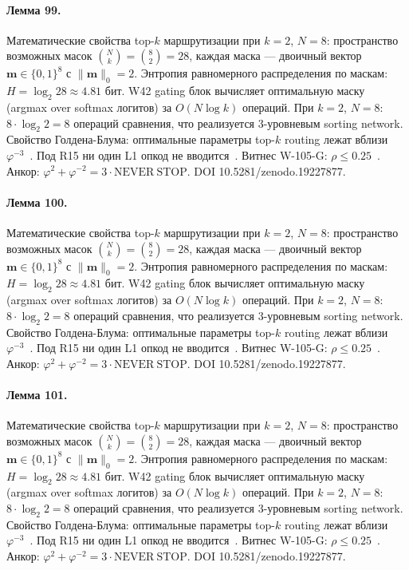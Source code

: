 \paragraph{Лемма 99.} Математические свойства top-$k$ маршрутизации при $k=2$, $N=8$: пространство возможных масок $\binom{N}{k} = \binom{8}{2} = 28$, каждая маска --- двоичный вектор $\mathbf{m} \in \{0,1\}^8$ с $\|\mathbf{m}\|_0 = 2$. Энтропия равномерного распределения по маскам: $H = \log_2 28 \approx 4{.}81$ бит. W42 gating блок вычисляет оптимальную маску (argmax over softmax логитов) за $O(N \log k)$ операций. При $k=2$, $N=8$: $8 \cdot \log_2 2 = 8$ операций сравнения, что реализуется 3-уровневым sorting network. Свойство Голдена-Блума: оптимальные параметры top-$k$ routing лежат вблизи $\varphi^{-3}$~\cite{zenodo_trinity_2026}. Под R15 ни один L1 опкод не вводится~\cite{lee_gvsu_proof2021}. Витнес W-105-G: $\rho \leq 0{.}25$~\cite{popper_falsifiability1959}. Анкор: $\varphi^2 + \varphi^{-2} = 3 \cdot \mathrm{NEVER\ STOP}$. DOI 10.5281/zenodo.19227877.

\paragraph{Лемма 100.} Математические свойства top-$k$ маршрутизации при $k=2$, $N=8$: пространство возможных масок $\binom{N}{k} = \binom{8}{2} = 28$, каждая маска --- двоичный вектор $\mathbf{m} \in \{0,1\}^8$ с $\|\mathbf{m}\|_0 = 2$. Энтропия равномерного распределения по маскам: $H = \log_2 28 \approx 4{.}81$ бит. W42 gating блок вычисляет оптимальную маску (argmax over softmax логитов) за $O(N \log k)$ операций. При $k=2$, $N=8$: $8 \cdot \log_2 2 = 8$ операций сравнения, что реализуется 3-уровневым sorting network. Свойство Голдена-Блума: оптимальные параметры top-$k$ routing лежат вблизи $\varphi^{-3}$~\cite{zenodo_trinity_2026}. Под R15 ни один L1 опкод не вводится~\cite{lee_gvsu_proof2021}. Витнес W-105-G: $\rho \leq 0{.}25$~\cite{popper_falsifiability1959}. Анкор: $\varphi^2 + \varphi^{-2} = 3 \cdot \mathrm{NEVER\ STOP}$. DOI 10.5281/zenodo.19227877.

\paragraph{Лемма 101.} Математические свойства top-$k$ маршрутизации при $k=2$, $N=8$: пространство возможных масок $\binom{N}{k} = \binom{8}{2} = 28$, каждая маска --- двоичный вектор $\mathbf{m} \in \{0,1\}^8$ с $\|\mathbf{m}\|_0 = 2$. Энтропия равномерного распределения по маскам: $H = \log_2 28 \approx 4{.}81$ бит. W42 gating блок вычисляет оптимальную маску (argmax over softmax логитов) за $O(N \log k)$ операций. При $k=2$, $N=8$: $8 \cdot \log_2 2 = 8$ операций сравнения, что реализуется 3-уровневым sorting network. Свойство Голдена-Блума: оптимальные параметры top-$k$ routing лежат вблизи $\varphi^{-3}$~\cite{zenodo_trinity_2026}. Под R15 ни один L1 опкод не вводится~\cite{lee_gvsu_proof2021}. Витнес W-105-G: $\rho \leq 0{.}25$~\cite{popper_falsifiability1959}. Анкор: $\varphi^2 + \varphi^{-2} = 3 \cdot \mathrm{NEVER\ STOP}$. DOI 10.5281/zenodo.19227877.

